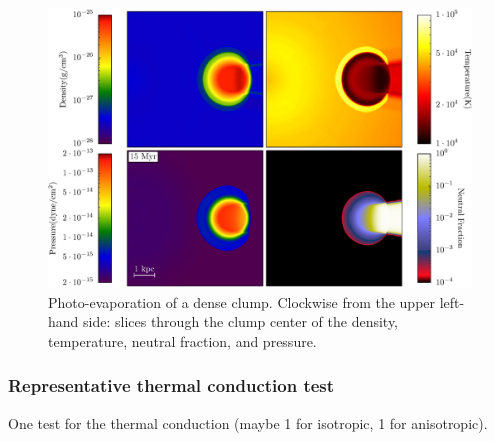 \begin{figure}
  \centering
  \includegraphics[width=1.0\textwidth]{figures/code-test-shadowing.eps}
  \caption{Photo-evaporation of a dense clump.  Clockwise from the
    upper left-hand side: slices through the clump center of the
    density, temperature, neutral fraction, and pressure.}
  \label{fig:shadowing}
\end{figure}





\subsubsection{Representative thermal conduction test}
\label{sec.tests.conduct}
One test for the thermal conduction (maybe 1 for isotropic, 1 for
anisotropic).

